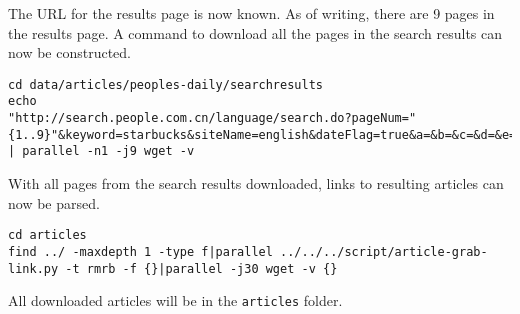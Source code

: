 The URL for the results page is now known. As of writing, there are 9 pages in
the results page. A command to download all the pages in the search results can
now be constructed.
\begin{verbatim}
cd data/articles/peoples-daily/searchresults
echo
"http://search.people.com.cn/language/search.do?pageNum="{1..9}"&keyword=starbucks&siteName=english&dateFlag=true&a=&b=&c=&d=&e=&f="
| parallel -n1 -j9 wget -v
\end{verbatim}
With all pages from the search results downloaded, links to resulting articles
can now be parsed.
\begin{verbatim}
cd articles
find ../ -maxdepth 1 -type f|parallel ../../../script/article-grab-link.py -t rmrb -f {}|parallel -j30 wget -v {}
\end{verbatim}
All downloaded articles will be in the \texttt{articles} folder.


